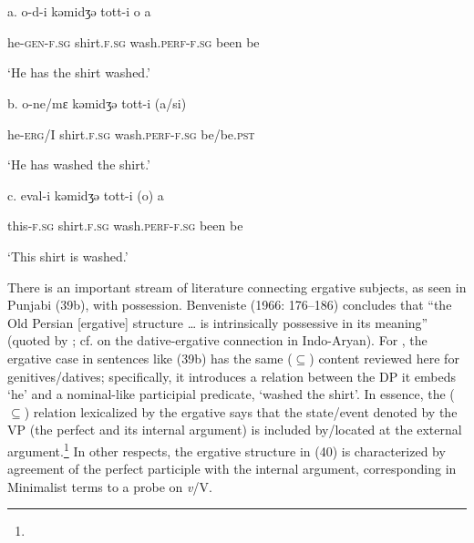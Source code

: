 \documentclass[output=paper]{langsci/langscibook}
\begin{document}
\ea%
    \label{ex:key:39}
    \gll\\
        \\
    \glt
    \z

          a.  o-d-i    kəmidʒə  tott-i       o  a

    he-\textsc{gen-f.sg}  shirt.\textsc{f.sg}   wash.\textsc{perf-f.sg}  been  be 

    ‘He has the shirt washed.’

\begin{styleSfondomedioiColorexi}
  b.  o-ne/mɛ  kəmidʒə   tott-i       (a/si)
\end{styleSfondomedioiColorexi}

    he-\textsc{erg}/I  shirt.\textsc{f.sg}   wash.\textsc{perf-f.sg}   be/be.\textsc{pst}

    ‘He has washed the shirt.’

\begin{styleSfondomedioiColorexi}
  c.  eval-i     kəmidʒə   tott-i       (o)  a
\end{styleSfondomedioiColorexi}

    this-\textsc{f.sg}    shirt.\textsc{f.sg}   wash.\textsc{perf-f.sg}   been  be 

    ‘This shirt is washed.’

There is an important stream of literature connecting ergative subjects, as seen in Punjabi (39b), with possession. Benveniste (1966: 176–186) concludes that “the Old Persian [ergative] structure … is intrinsically possessive in its meaning” (quoted by \citealt{Montaut2004}; cf. \citealt{Butt2006} on the dative-ergative connection in Indo-Aryan). For \citet{ManziniEtAl2015}, the ergative case in sentences like (39b) has the same (${\subseteq}$) content reviewed here for genitives/datives; specifically, it introduces a relation between the DP it embeds ‘he’ and a nominal-like participial predicate, ‘washed the shirt’. In essence, the (${\subseteq}$) relation lexicalized by the ergative says that the state/event denoted by the VP (the perfect and its internal argument) is included by/located at the external argument.\footnote{  } In other respects, the ergative structure in (40) is characterized by agreement of the perfect participle with the internal argument, corresponding in Minimalist terms to a probe on \textit{v}/V.
\end{document}
